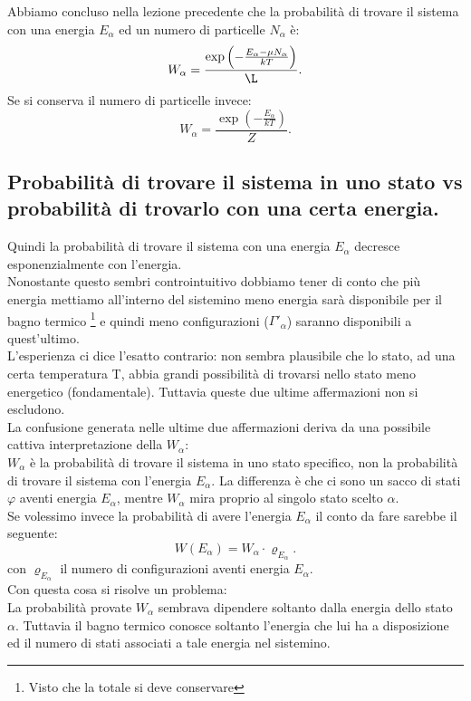 
Abbiamo concluso nella lezione precedente che la probabilità di trovare il sistema con una energia $E_{\alpha}$ ed un numero di particelle $N_{\alpha}$ è:
\[
	W_{\alpha} = \frac{\exp\left(- \frac{E_{\alpha}-\mu N_{\alpha}}{kT} \right) }{\L}
.\] 
Se si conserva il numero di particelle invece:
\[
	W_{\alpha} = \frac{\exp\left(-\frac{E_{\alpha}}{kT}\right)}{Z}
.\] 
\subsection{Probabilità di trovare il sistema in uno stato vs probabilità di trovarlo con una certa energia.}%
Quindi la probabilità di trovare il sistema con una energia $E_{\alpha}$ decresce esponenzialmente con l'energia. \\
Nonostante questo sembri controintuitivo dobbiamo tener di conto che più energia mettiamo all'interno del sistemino meno energia sarà disponibile per il bagno termico \footnote{Visto che la totale si deve conservare} e quindi meno configurazioni ($\Gamma'_{\alpha}$) saranno disponibili a quest'ultimo. \\
L'esperienza ci dice l'esatto contrario: non sembra plausibile che lo stato, ad una certa temperatura T, abbia grandi possibilità di trovarsi nello stato meno energetico (fondamentale). Tuttavia queste due ultime affermazioni non si escludono.\\
La confusione generata nelle ultime due affermazioni deriva da una possibile cattiva interpretazione della $W_{\alpha}$:\\
 $W_{\alpha}$ è la probabilità di trovare il sistema in uno stato specifico, non la probabilità di trovare il sistema con l'energia $E_{\alpha}$. La differenza è che ci sono un sacco di stati $\varphi$ aventi energia $E_{\alpha}$, mentre $W_{\alpha}$ mira proprio al singolo stato scelto $\alpha$. \\
Se volessimo invece la probabilità di avere l'energia $E_{\alpha}$ il conto da fare sarebbe il seguente:
\[
	W\left( E_{\alpha} \right) = W_{\alpha}\cdot \varrho_{E_{\alpha}}
.\] 
con $\varrho_{E_{\alpha}}$  il numero di configurazioni aventi energia  $E_{\alpha}$.\\
Con questa cosa si risolve un problema:\\
La probabilità provate $W_{\alpha}$ sembrava dipendere soltanto dalla energia dello stato $\alpha$. Tuttavia il bagno termico conosce soltanto l'energia che lui ha a disposizione ed il numero di stati associati a tale energia nel sistemino.\\
